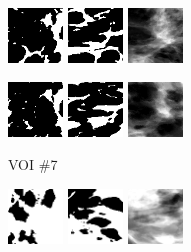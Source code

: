 \documentclass[journal]{IEEEtran}
\begin{document}
\begin{figure}[!htb]
  \includegraphics[width=0.13\textwidth]
  {figure/all/dataset_3/roi_coronal}
  \includegraphics[width=0.13\textwidth]
  {figure/all/dataset_3/roi_saggital}
  \includegraphics[width=0.13\textwidth]
  {figure/all/dataset_3/proj_roi}

  \includegraphics[width=0.13\textwidth]
  {figure/all/dataset_3/model_coronal}
  \includegraphics[width=0.13\textwidth]
  {figure/all/dataset_3/model_saggital}
  \includegraphics[width=0.13\textwidth]
  {figure/all/dataset_3/proj_roi_inten10}

  {\fontsize{9}{9}\selectfont VOI \#7} \vspace{1mm}

  \includegraphics[width=0.13\textwidth]
  {figure/all/dataset_7/roi_coronal}
  \includegraphics[width=0.13\textwidth]
  {figure/all/dataset_7/roi_saggital}
  \includegraphics[width=0.13\textwidth]
  {figure/all/dataset_7/proj_roi}


\end{figure}
\end{document}
